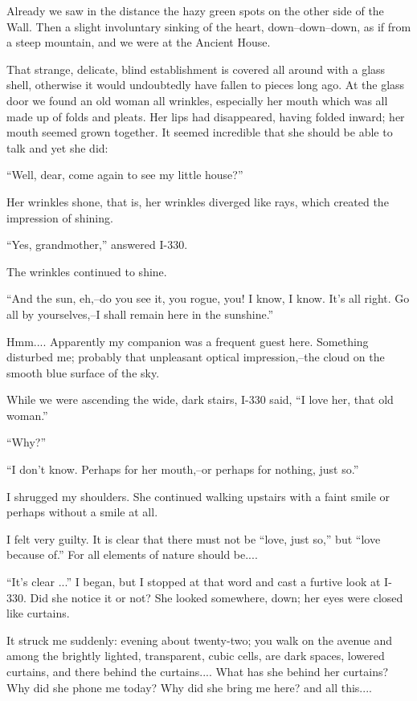 \documentclass[11pt,openany]{book}
\begin{document}
Already we saw in the distance the hazy green spots on the other side of the Wall. Then a slight involuntary sinking of the heart, down--down--down, as if from a steep mountain, and we were at the Ancient House.

That strange, delicate, blind establishment is covered all around with a glass shell, otherwise it would undoubtedly have fallen to pieces long ago. At the glass door we found an old woman all wrinkles, especially her mouth which was all made up of folds and pleats. Her lips had disappeared, having folded inward; her mouth seemed grown together. It seemed incredible that she should be able to talk and yet she did:

``Well, dear, come again to see my little house?''

Her wrinkles shone, that is, her wrinkles diverged like rays, which created the impression of shining.

``Yes, grandmother,'' answered I-330.

The wrinkles continued to shine.

``And the sun, eh,--do you see it, you rogue, you! I know, I know. It's all right. Go all by yourselves,--I shall remain here in the sunshine.''

Hmm.... Apparently my companion was a frequent guest here. Something disturbed me; probably that unpleasant optical impression,--the cloud on the smooth blue surface of the sky.

While we were ascending the wide, dark stairs, I-330 said, ``I love her, that old woman.''

``Why?''

``I don't know. Perhaps for her mouth,--or perhaps for nothing, just so.''

I shrugged my shoulders. She continued walking upstairs with a faint smile or perhaps without a smile at all.

I felt very guilty. It is clear that there must not be ``love, just so,'' but ``love because of.'' For all elements of nature should be....

``It's clear ...'' I began, but I stopped at that word and cast a furtive look at I-330. Did she notice it or not? She looked somewhere, down; her eyes were closed like curtains.

It struck me suddenly: evening about twenty-two; you walk on the avenue and among the brightly lighted, transparent, cubic cells, are dark spaces, lowered curtains, and there behind the curtains.... What has she behind her curtains? Why did she phone me today? Why did she bring me here? and all this....
\end{document}
